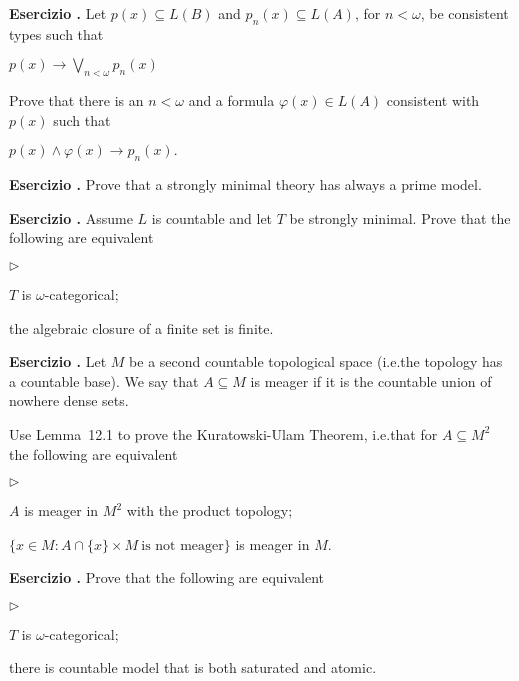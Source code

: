 \documentclass[10pt]{article}
\def\phi{\varphi}
\def\imp{\rightarrow}
\newcommand{\labella}[1]{{\sf\footnotesize #1}\hfill}
\renewenvironment{itemize}
  {\begin{list}{$\triangleright$}{%
   \setlength{\parskip}{0mm}
   \setlength{\topsep}{0mm}
   \setlength{\rightmargin}{0mm}
   \setlength{\listparindent}{0mm}
   \setlength{\itemindent}{0mm}
   \setlength{\labelwidth}{3ex}
   \setlength{\itemsep}{0mm}
   \setlength{\parsep}{0mm}
   \setlength{\partopsep}{0mm}
   \setlength{\labelsep}{1ex}
   \setlength{\leftmargin}{\labelwidth+\labelsep}
   \let\makelabel\labella}}{%
   \end{list}}
\newcounter{ex}
\newenvironment{exercise}{\clearpage\addtocounter{ex}{1}\textbf{Esercizio \theex.\quad}}{}
\begin{document}
\clearpage%
\setcounter{ex}{0}

\begin{exercise}
Let $p(x)\subseteq L(B)$ and $p_n(x)\subseteq L(A)$, for $n<\omega$, be consistent types such that\smallskip

\qquad$\displaystyle p(x)\imp\bigvee_{n<\omega}p_n(x)$

\noindent Prove that there is an $n<\omega$ and a formula $\phi(x)\in L(A)$ consistent with $p(x)$ such that \smallskip

\qquad$\displaystyle p(x)\wedge\phi(x)\imp p_n(x).$
\end{exercise}


\begin{exercise}
Prove that a strongly minimal theory has always a prime model.
\end{exercise}



\begin{exercise} 
Assume $L$ is countable and let $T$ be strongly minimal.
Prove that the following are equivalent
\begin{itemize}
\item[1.] $T$ is $\omega$-categorical;
\item[2.] the algebraic closure of a finite set is finite.
\end{itemize}
\end{exercise}


\clearpage%
\setcounter{ex}{0}


\begin{exercise}
Let $M$ be a second countable topological space (i.e.\@ the topology has a countable base).
We say that $A\subseteq M$ is meager if it is the countable union of nowhere dense sets.

Use Lemma~12.1 to prove the Kuratowski-Ulam Theorem, i.e.\@ that for $A\subseteq M^2$ the following are equivalent
\begin{itemize}
\item[1.] $A$ is meager in $M^2$  with the product topology;
\item[2.] $\Big\{x\in M : A\cap \{x\}{\times}M \ \textrm{is not meager}\Big\}$ is meager in $M$.
\end{itemize}
\end{exercise}



\begin{exercise}\label{ex_omega_cat_sat=atomic}
Prove that the following are equivalent
\begin{itemize}   
\item[1.] $T$ is $\omega$-categorical;
\item[2.] there is countable model that is both saturated and atomic.
\end{itemize}
\end{exercise}
\end{document}
